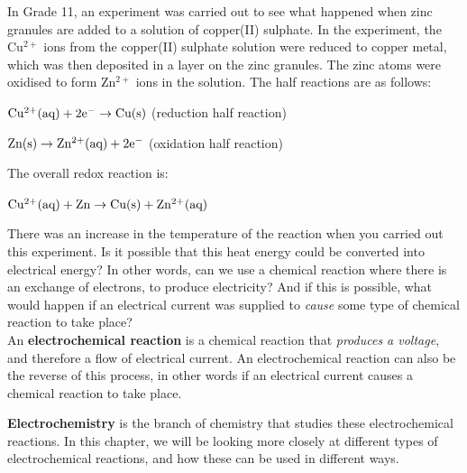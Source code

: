 \vspace{0.5cm}

In Grade 11, an experiment was carried out to see what happened when zinc granules are added to a solution of copper(II) sulphate. In the experiment, the Cu$^{2+}$ ions from the copper(II) sulphate solution were reduced to copper metal, which was then deposited in a layer on the zinc granules. The zinc atoms were oxidised to form Zn$^{2+}$ ions in the solution. The half reactions are as follows: 

\begin{center}
$\rm{Cu^{2+}(aq) + 2e^{-} \rightarrow Cu(s)}$ (reduction half reaction)

$\rm{Zn(s) \rightarrow Zn^{2+}(aq) + 2e^{-}}$ (oxidation half reaction)
\end{center}

The overall redox reaction is:
\begin{center}
$\rm{Cu^{2+}(aq) + Zn \rightarrow Cu(s) + Zn^{2+}(aq)}$
\end{center}

There was an increase in the temperature of the reaction when you carried out this experiment. Is it possible that this heat energy could be converted into electrical energy? In other words, can we use a chemical reaction where there is an exchange of electrons, to produce electricity? And if this is possible, what would happen if an electrical current was supplied to \textit{cause} some type of chemical reaction to take place?\\

An \textbf{electrochemical reaction} is a chemical reaction that \textit{produces a voltage}, and therefore a flow of electrical current. An electrochemical reaction can also be the reverse of this process, in other words if an electrical current causes a chemical reaction to take place.


\textbf{Electrochemistry} is the branch of chemistry that studies these electrochemical reactions. In this chapter, we will be looking more closely at different types of electrochemical reactions, and how these can be used in different ways.






